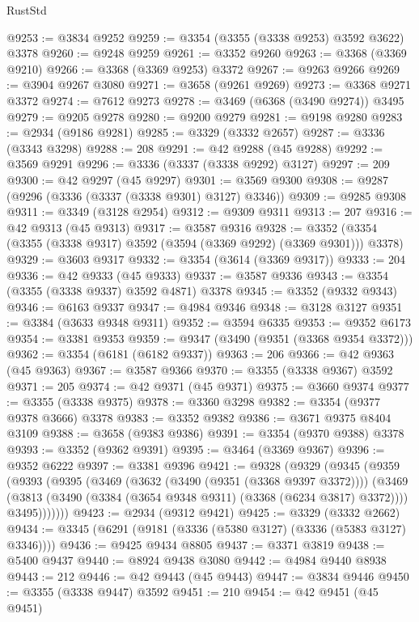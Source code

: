 \begin{lexlean}{RustStd}
\begin{coremodule}
@9253 := @3834 @9252
@9259 := @3354 (@3355 (@3338 @9253) @3592 @3622) @3378
@9260 := @9248 @9259
@9261 := @3352 @9260
@9263 := @3368 (@3369 @9210)
@9266 := @3368 (@3369 @9253) @3372
@9267 := @9263 @9266
@9269 := @3904 @9267 @3080
@9271 := @3658 (@9261 @9269)
@9273 := @3368 @9271 @3372
@9274 := @7612 @9273
@9278 := @3469 (@6368 (@3490 @9274)) @3495
@9279 := @9205 @9278
@9280 := @9200 @9279
@9281 := @9198 @9280
@9283 := @2934 (@9186 @9281)
@9285 := @3329 (@3332 @2657)
@9287 := @3336 (@3343 @3298)
@9288 := 208
@9291 := @42 @9288 (@45 @9288)
@9292 := @3569 @9291
@9296 := @3336 (@3337 (@3338 @9292) @3127)
@9297 := 209
@9300 := @42 @9297 (@45 @9297)
@9301 := @3569 @9300
@9308 := @9287 (@9296 (@3336 (@3337 (@3338 @9301) @3127) @3346))
@9309 := @9285 @9308
@9311 := @3349 (@3128 @2954)
@9312 := @9309 @9311
@9313 := 207
@9316 := @42 @9313 (@45 @9313)
@9317 := @3587 @9316
@9328 := @3352 (@3354 (@3355 (@3338 @9317) @3592 (@3594 (@3369 @9292) (@3369 @9301))) @3378)
@9329 := @3603 @9317
@9332 := @3354 (@3614 (@3369 @9317))
@9333 := 204
@9336 := @42 @9333 (@45 @9333)
@9337 := @3587 @9336
@9343 := @3354 (@3355 (@3338 @9337) @3592 @4871) @3378
@9345 := @3352 (@9332 @9343)
@9346 := @6163 @9337
@9347 := @4984 @9346
@9348 := @3128 @3127
@9351 := @3384 (@3633 @9348 @9311)
@9352 := @3594 @6335
@9353 := @9352 @6173
@9354 := @3381 @9353
@9359 := @9347 (@3490 (@9351 (@3368 @9354 @3372)))
@9362 := @3354 (@6181 (@6182 @9337))
@9363 := 206
@9366 := @42 @9363 (@45 @9363)
@9367 := @3587 @9366
@9370 := @3355 (@3338 @9367) @3592
@9371 := 205
@9374 := @42 @9371 (@45 @9371)
@9375 := @3660 @9374
@9377 := @3355 (@3338 @9375)
@9378 := @3360 @3298
@9382 := @3354 (@9377 @9378 @3666) @3378
@9383 := @3352 @9382
@9386 := @3671 @9375 @8404 @3109
@9388 := @3658 (@9383 @9386)
@9391 := @3354 (@9370 @9388) @3378
@9393 := @3352 (@9362 @9391)
@9395 := @3464 (@3369 @9367)
@9396 := @9352 @6222
@9397 := @3381 @9396
@9421 := @9328
    (@9329
      (@9345
        (@9359
          (@9393
            (@9395
              (@3469
                (@3632 (@3490 (@9351 (@3368 @9397 @3372))))
                (@3469
                  (@3813 (@3490 (@3384 (@3654 @9348 @9311) (@3368 (@6234 @3817) @3372))))
                  @3495)))))))
@9423 := @2934 (@9312 @9421)
@9425 := @3329 (@3332 @2662)
@9434 := @3345 (@6291 (@9181 (@3336 (@5380 @3127) (@3336 (@5383 @3127) @3346))))
@9436 := @9425 @9434 @8805
@9437 := @3371 @3819
@9438 := @5400 @9437
@9440 := @8924 @9438 @3080
@9442 := @4984 @9440 @8938
@9443 := 212
@9446 := @42 @9443 (@45 @9443)
@9447 := @3834 @9446
@9450 := @3355 (@3338 @9447) @3592
@9451 := 210
@9454 := @42 @9451 (@45 @9451)

\end{coremodule}
\end{lexlean}

